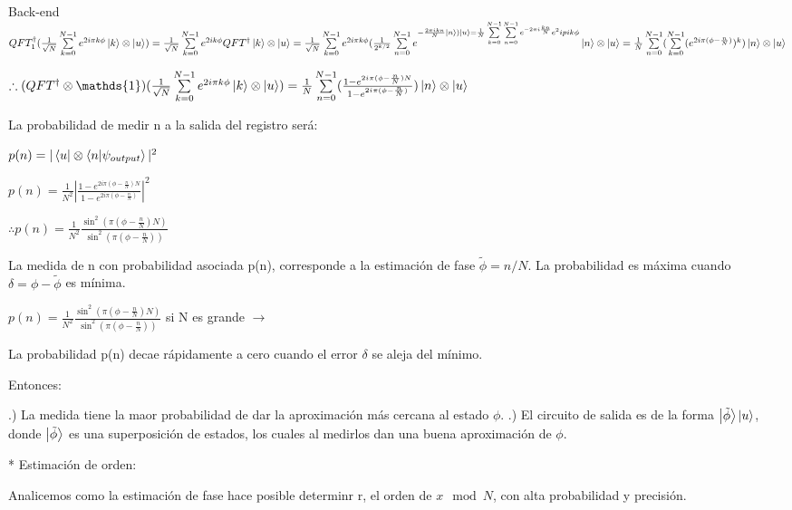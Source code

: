Back-end $QFT_1^\dagger (\frac{1}{\sqrt{N}} \sum\limits_{k=0}^{N-1} e^{2 i \pi k \phi} \ket{k} \otimes \ket{u}) = \frac{1}{\sqrt{N}} \sum\limits_{k=0}^{N-1} e^{2 i k \phi} QFT^\dagger \ket{k} \otimes \ket{u} = \frac{1}{\sqrt{N}} \sum\limits_{k=0}^{N-1} e^{2 i \pi k \phi} (\frac{1}{2^{k/2}} \sum\limits_{n=0}^{N-1} e^{-\frac{2 \pi i k n}{N} \ket{n}) \ket{u} = \frac{1}{N} \sum\limits_{k=0}^{N-1} \sum\limits_{n=0}^{N-1} e^{- 2 \pi i \frac{k n}{N}} e^2 i pi k \phi} \ket{n} \otimes \ket{u} = \frac{1}{N} \sum\limits_{n=0}^{N-1} (\sum\limits_{k=0}^{N-1} (e^{2 i \pi (\phi - \frac{n}{N})})^k ) \ket{n} \otimes \ket{u}$

$\therefore (QFT^\dagger \otimes \mathds{1}) (\frac{1}{\sqrt{N}} \sum\limits_{k=0}^{N-1} e^{2 i \pi k \phi} \ket{k} \otimes \ket{u}) = \frac{1}{N} \sum\limits_{n=0}^{N-1} (\frac{1 - e^{2 i \pi (\phi - \frac{n}{N})N}}{1 - e^{2 i \pi (\phi - \frac{n}{N})}}) \ket{n} \otimes \ket{u}$

La probabilidad de medir n a la salida del registro será:

$p(n) = |\bra{u} \otimes \bra{n} \ket{\psi_{output}}|^2$

$p(n) = \frac{1}{N^2} |\frac{1 - e^{2 i \pi (\phi - \frac{n}{N})N}}{1 - e^{2 i \pi (\phi - \frac{n}{N})}}|^2$

$\therefore p(n) = \frac{1}{N^2} \frac{\sin^2(\pi (\phi - \frac{n}{N}) N)}{\sin^2(\pi (\phi - \frac{n}{N}))}$

La medida de n con probabilidad asociada p(n), corresponde a la estimación de fase $\tilde{\phi} = n/N$. La probabilidad es máxima cuando $\delta = \phi - \tilde{\phi}$ es mínima.

$p(n) = \frac{1}{N^2} \frac{\sin^2(\pi (\phi - \frac{n}{N}) N)}{\sin^2(\pi (\phi - \frac{n}{N}))}$ si N es grande $\rightarrow$ %

La probabilidad p(n) decae rápidamente a cero cuando el error $\delta$ se aleja del mínimo.

Entonces:

.) La medida tiene la maor probabilidad de dar la aproximación más cercana al estado $\phi$.
.) El circuito de salida es de la forma $\ket{\tilde{\phi}} \ket{u}$, donde $\ket{\tilde{\phi}}$ es una superposición de estados, los cuales al medirlos dan una buena aproximación de $\phi$.

* Estimación de orden:

Analicemos como la estimación de fase hace posible determinr r, el orden de $x \mod N$, con alta probabilidad y precisión.

